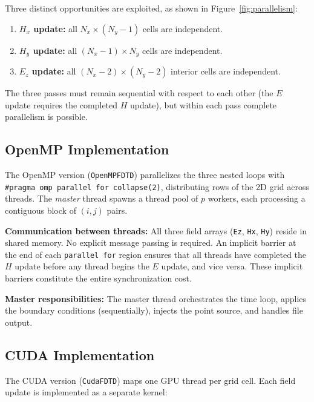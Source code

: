 \documentclass[12pt,a4paper]{article}
\begin{document}
Three distinct opportunities are exploited, as shown in
Figure~\ref{fig:parallelism}:
\begin{enumerate}
    \item \textbf{$H_x$ update:} all $N_x \times (N_y-1)$ cells are independent.
    \item \textbf{$H_y$ update:} all $(N_x-1) \times N_y$ cells are independent.
    \item \textbf{$E_z$ update:} all $(N_x-2) \times (N_y-2)$ interior cells are independent.
\end{enumerate}
The three passes must remain sequential with respect to each other
(the $E$ update requires the completed $H$ update),
but within each pass complete parallelism is possible.


\subsection{OpenMP Implementation}

The OpenMP version (\texttt{OpenMPFDTD}) parallelizes the three
nested loops with \texttt{\#pragma omp parallel for collapse(2)},
distributing rows of the 2D grid across threads.
The \emph{master} thread spawns a thread pool of $p$ workers,
each processing a contiguous block of $(i,j)$ pairs.

\textbf{Communication between threads:}
All three field arrays (\texttt{Ez}, \texttt{Hx}, \texttt{Hy})
reside in shared memory.
No explicit message passing is required.
An implicit barrier at the end of each \texttt{parallel for} region
ensures that all threads have completed the $H$ update before any
thread begins the $E$ update, and vice versa.
These implicit barriers constitute the entire synchronization cost.

\textbf{Master responsibilities:}
The master thread orchestrates the time loop, applies the boundary
conditions (sequentially), injects the point source, and handles
file output.

\subsection{CUDA Implementation}

The CUDA version (\texttt{CudaFDTD}) maps one GPU thread per grid
cell.
Each field update is implemented as a separate kernel:
\end{document}
